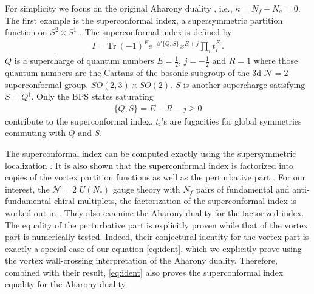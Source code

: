 \documentclass[a4paper,11pt]{article}
\begin{document}
For simplicity we focus on the original Aharony duality \cite{Aharony:1997gp}, i.e., $\kappa = N_f-N_a = 0$. The first example is the superconformal index, a supersymmetric partition function on $S^2 \times S^1$ \cite{Bhattacharya:2008zy,Bhattacharya:2008bja}. The superconformal index is defined by
\begin{align}
I = \mathrm{Tr}~ (-1)^F e^{-\beta' \{Q,S\}} x^{E+j} \prod_i t_i^{F_i}.
\end{align}
$Q$ is a supercharge of quantum numbers $E = \frac{1}{2}$, $j = -\frac{1}{2}$ and $R = 1$ where those quantum numbers are the Cartans of the bosonic subgroup of the 3d $\mathcal N = 2$ superconformal group, $SO(2,3) \times SO(2)$. $S$ is another supercharge satisfying $S = Q^\dagger$. Only the BPS states saturating
\begin{align}
\{Q,S\} = E-R-j \geq 0
\end{align}
contribute to the superconformal index. $t_i$'s are fugacities for global symmetries commuting with $Q$ and $S$.

The superconformal index can be computed exactly using the supersymmetric localization \cite{Kim:2009wb,Imamura:2011su}. It is also shown that the superconformal index is factorized into copies of the vortex partition functions as well as the perturbative part \cite{Krattenthaler:2011da,Hwang:2012jh,Fujitsuka:2013fga,Benini:2013yva,Hwang:2015wna}. For our interest, the $\mathcal N = 2$ $U(N_c)$ gauge theory with $N_f$ pairs of fundamental and anti-fundamental chiral multiplets, the factorization of the superconformal index is worked out in \cite{Hwang:2012jh}. They also examine the Aharony duality for the factorized index. The equality of the perturbative part is explicitly proven while that of the vortex part is numerically tested. Indeed, their conjectural identity for the vortex part is exactly a special case of our equation \eqref{eq:ident}, which we explicitly prove using the vortex wall-crossing interpretation of the Aharony duality. Therefore, combined with their result, \eqref{eq:ident} also proves the superconformal index equality for the Aharony duality.
\\
\end{document}
